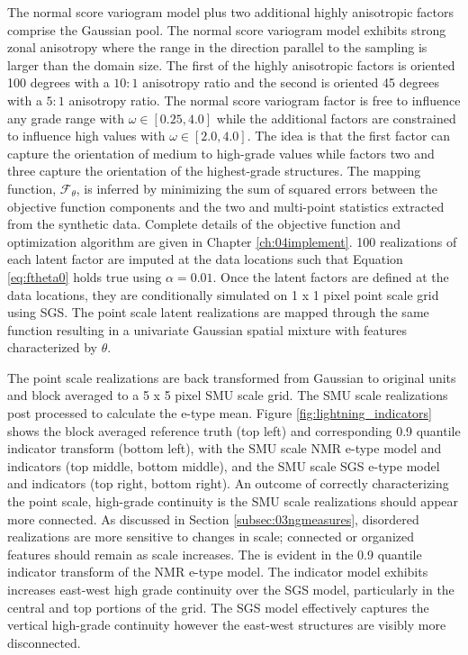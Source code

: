 The normal score variogram model plus two additional highly anisotropic factors comprise the Gaussian pool. The normal score variogram model exhibits strong zonal anisotropy where the range in the direction parallel to the sampling is larger than the domain size. The first of the highly anisotropic factors is oriented 100 degrees with a $10:1$ anisotropy ratio and the second is oriented 45 degrees with a  $5:1$ anisotropy ratio. The normal score variogram factor is free to influence any grade range with $\omega \in [0.25, 4.0]$ while the additional factors are constrained to influence high values with $\omega \in [2.0, 4.0]$. The idea is that the first factor can capture the orientation of medium to high-grade values while factors two and three capture the orientation of the highest-grade structures. The mapping function, $\mathcal{F}_{\theta}$, is inferred by minimizing the sum of squared errors between the objective function components and the two and multi-point statistics extracted from the synthetic data. Complete details of the objective function and optimization algorithm are given in Chapter \ref{ch:04implement}. 100 realizations of each latent factor are imputed at the data locations such that Equation \ref{eq:ftheta0} holds true using $\alpha = 0.01$. Once the latent factors are defined at the data locations, they are conditionally simulated on 1 x 1 pixel point scale grid using \gls{SGS}. The point scale latent realizations are mapped through the same function resulting in a univariate Gaussian spatial mixture with features characterized by $\theta$.

The point scale realizations are back transformed from Gaussian to original units and block averaged to a 5 x 5 pixel \gls{SMU} scale grid. The \gls{SMU} scale realizations post processed to calculate the e-type mean. Figure \ref{fig:lightning_indicators} shows the block averaged reference truth (top left) and corresponding 0.9 quantile indicator transform (bottom left), with the \gls{SMU} scale \gls{NMR} e-type model and indicators (top middle, bottom middle), and the \gls{SMU} scale \gls{SGS} e-type model and indicators (top right, bottom right). An outcome of correctly characterizing the point scale, high-grade continuity is the \gls{SMU} scale realizations should appear more connected. As discussed in Section \ref{subsec:03ngmeasures}, disordered realizations are more sensitive to changes in scale; connected or organized features should remain as scale increases. The is evident in the 0.9 quantile indicator transform of the \gls{NMR} e-type model. The indicator model exhibits increases east-west high grade continuity over the \gls{SGS} model, particularly in the central and top portions of the grid. The \gls{SGS} model effectively captures the vertical high-grade continuity however the east-west structures are visibly more disconnected.

